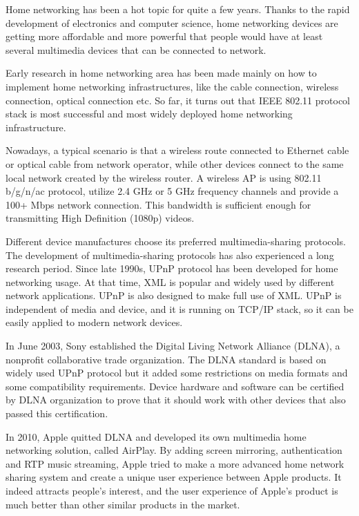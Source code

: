 
Home networking has been a hot topic for quite a few years. Thanks to the rapid development 
of electronics and computer science, home networking devices are getting more affordable 
and more powerful that people would have at least several multimedia devices that can be 
connected to network.

Early research in home networking area has been made mainly on how to implement home networking 
infrastructures, like the cable connection, wireless connection, optical connection etc. So far, 
it turns out that IEEE 802.11 protocol stack is most successful and most widely deployed home 
networking infrastructure.

Nowadays, a typical scenario is that a wireless route connected to Ethernet cable or optical 
cable from network operator, while other devices connect to the same local network created by 
the wireless router. A wireless AP is using 802.11 b/g/n/ac protocol, utilize 2.4 GHz or 5 GHz 
frequency channels and provide a 100+ Mbps network connection. This bandwidth is sufficient 
enough for transmitting High Definition (1080p) videos.

Different device manufactures choose its preferred multimedia-sharing protocols. The development 
of multimedia-sharing protocols has also experienced a long research period. Since late 1990s, 
UPnP protocol has been developed for home networking usage. At that time, XML is popular and 
widely used by different network applications. UPnP is also designed to make full use of XML. 
UPnP is independent of media and device, and it is running on TCP/IP stack, so it can be easily 
applied to modern network devices. 

In June 2003, Sony established the Digital Living Network Alliance (DLNA), a nonprofit collaborative 
trade organization. The DLNA standard is based on widely used UPnP protocol but it added some 
restrictions on media formats and some compatibility requirements. Device hardware and software 
can be certified by DLNA organization to prove that it should work with other devices that also 
passed this certification.

In 2010, Apple quitted DLNA and developed its own multimedia home networking solution, called 
AirPlay. By adding screen mirroring, authentication and RTP music streaming, Apple tried to make 
a more advanced home network sharing system and create a unique user experience between Apple 
products. It indeed attracts people's interest, and the user experience of Apple's product is 
much better than other similar products in the market. 

